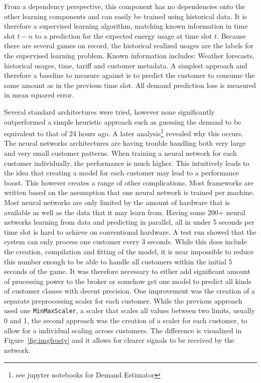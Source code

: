 From a dependency perspective, this component has no dependencies onto the other learning components and can easily be
trained using historical data. It is therefore a supervised learning algorithm, matching known information in time slot
$t-n$ to a prediction for the expected energy usage at time slot $t$. Because there are several games on record, the
historical realized usages are the labels for the supervised learning problem. Known information includes: Weather
forecasts, historical usages, time, tariff and customer metadata. A simplest approach and therefore a baseline to
measure against is to predict the customer to consume the same amount as in the previous time slot. All demand
prediction loss is measured in mean squared error.  

Several standard architectures were tried, however none significantly outperformed a simple heuristic approach such as
guessing the demand to be equivalent to that of 24 hours ago. A later analysis\footnote{see jupyter notebooks for Demand
Estimator}
revealed why this occurs. The neural networks architectures are having trouble handling both very large and very small
customer patterns. When training a neural network for each customer individually, the performance is much higher. This
intuitively leads to the idea that creating a model for each customer may lead to a performance boost. This however
creates a range of other complications. Most frameworks are written based on the assumption that one neural network is
trained per machine. Most neural networks are only limited by the amount of hardware that is available as well as the
data that it may learn from. Having some 200+ neural networks learning from data and predicting in parallel, all in
under 5 seconds per time slot is hard to achieve on conventional hardware. A test run showed that the system can only
process one customer every 3 seconds. While this does include the creation, compilation and fitting of the model, it is
near impossible to reduce this number enough to be able to handle all customers within the initial 5 seconds of the
game. It was therefore necessary to either add significant amount of processing power to the broker or somehow get one
model to predict all kinds of customer classes with decent precision. One improvement was the creation of a separate
preprocessing scaler for each customer. While the previous approach used one \texttt{MinMaxScaler}, a scaler that scales
all values between two limits, usually 0 and 1, the second approach was the creation of a scaler for each customer, to
allow for a individual scaling across customers. The difference is visualized in Figure~\ref{fig:imgfrosty} and it
allows for clearer signals to be received by the network.


